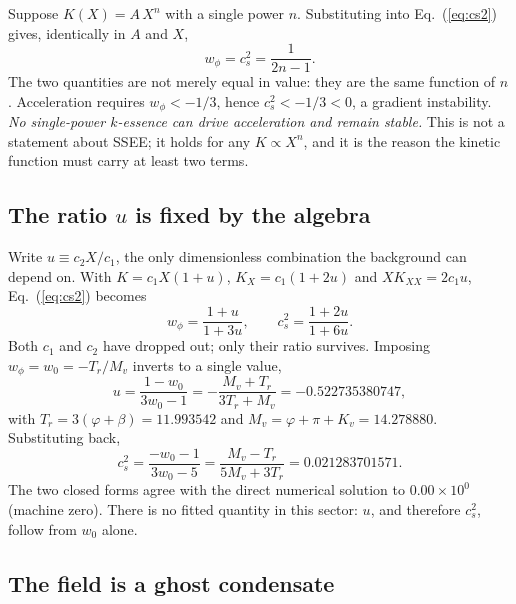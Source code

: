 \documentclass[12pt,a4paper]{article}
\newcommand{\phiG}{\varphi}
\begin{document}
Suppose $K(X) = A\,X^{n}$ with a single power $n$.  Substituting into
Eq.~(\ref{eq:cs2}) gives, identically in $A$ and $X$,
%
\begin{equation}
  w_\phi = c_s^{2} = \frac{1}{2n-1}.
  \label{eq:power_law}
\end{equation}
%
The two quantities are not merely equal in value: they are the same
function of $n$.  Acceleration requires $w_\phi < -1/3$, hence
$c_s^2 < -1/3 < 0$, a gradient instability.  \emph{No single-power
$k$-essence can drive acceleration and remain stable.}  This is not a
statement about SSEE; it holds for any $K \propto X^n$, and it is the
reason the kinetic function must carry at least two terms.

\subsection{The ratio $u$ is fixed by the algebra}

Write $u \equiv c_2 X / c_1$, the only dimensionless combination the
background can depend on.  With $K = c_1X(1+u)$, $K_X = c_1(1+2u)$ and
$XK_{XX} = 2c_1 u$, Eq.~(\ref{eq:cs2}) becomes
%
\begin{equation}
  w_\phi = \frac{1+u}{1+3u},
  \qquad
  c_s^{2} = \frac{1+2u}{1+6u}.
  \label{eq:w_cs_of_u}
\end{equation}
%
Both $c_1$ and $c_2$ have dropped out; only their ratio survives.
Imposing $w_\phi = w_0 = -T_r/M_v$ inverts to a single value,
%
\begin{equation}
  \boxed{
  u = \frac{1-w_0}{3w_0-1}
    = -\frac{M_v+T_r}{3T_r+M_v}
    = -0.522735380747,}
  \label{eq:u_alg}
\end{equation}
%
with $T_r = 3(\phiG+\beta) = 11.993542$ and
$M_v = \phiG+\pi+K_v = 14.278880$.  Substituting back,
%
\begin{equation}
  \boxed{
  c_s^{2} = \frac{-w_0-1}{3w_0-5}
          = \frac{M_v-T_r}{5M_v+3T_r}
          = 0.021283701571.}
  \label{eq:cs2_alg}
\end{equation}
%
The two closed forms agree with the direct numerical solution to
$0.00\times10^{0}$ (machine zero).  There is no fitted quantity in this
sector: $u$, and therefore $c_s^2$, follow from $w_0$ alone.

\subsection{The field is a ghost condensate}
\end{document}
